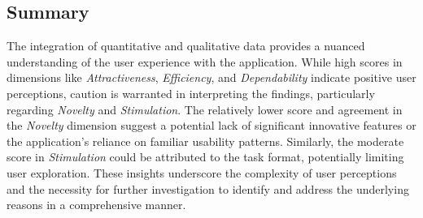 \subsection*{Summary}
\label{subsec:findings:summary}

The integration of quantitative and qualitative data provides a nuanced understanding of the user experience with the application. 
While high scores in dimensions like \emph{Attractiveness}, \emph{Efficiency}, and \emph{Dependability} indicate positive user perceptions, caution is warranted in interpreting the findings, particularly regarding \emph{Novelty} and \emph{Stimulation}. 
The relatively lower score and agreement in the \emph{Novelty} dimension suggest a potential lack of significant innovative features or the application's reliance on familiar usability patterns. 
Similarly, the moderate score in \emph{Stimulation} could be attributed to the task format, potentially limiting user exploration. 
These insights underscore the complexity of user perceptions and the necessity for further investigation to identify and address the underlying reasons in a comprehensive manner.
